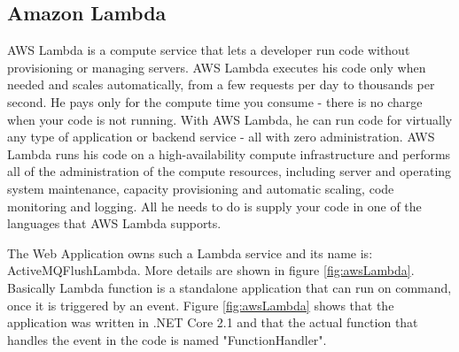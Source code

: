 \subsection{Amazon Lambda}
\label{chap:04:03:07}

AWS Lambda is a compute service that lets a developer run code without provisioning or managing servers. AWS Lambda executes his code only when needed and scales automatically, from a few requests per day to thousands per second. He pays only for the compute time you consume - there is no charge when your code is not running. With AWS Lambda, he can run code for virtually any type of application or backend service - all with zero administration. AWS Lambda runs his code on a high-availability compute infrastructure and performs all of the administration of the compute resources, including server and operating system maintenance, capacity provisioning and automatic scaling, code monitoring and logging. All he needs to do is supply your code in one of the languages that AWS Lambda supports.\cite{aws-lambda}

The Web Application owns such a Lambda service and its name is: ActiveMQFlushLambda. More details are shown in figure \ref{fig:awsLambda}. Basically Lambda function is a standalone application that can run on command, once it is triggered by an event. Figure \ref{fig:awsLambda} shows that the application was written in .NET Core 2.1 and that the actual function that handles the event in the code is named "FunctionHandler".

